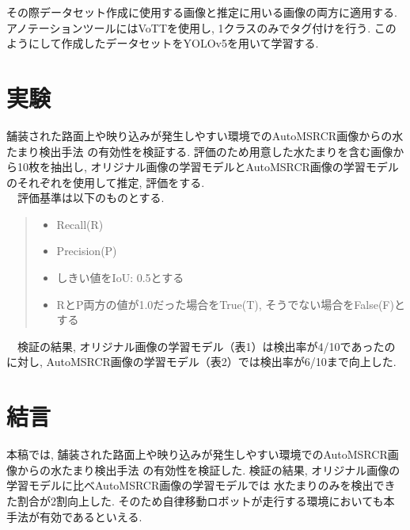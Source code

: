 \documentclass[10pt]{jarticle}
\begin{document}
    その際データセット作成に使用する画像と推定に用いる画像の両方に適用する. 
    アノテーションツールにはVoTTを使用し, 1クラスのみでタグ付けを行う. 
    このようにして作成したデータセットをYOLOv5を用いて学習する. 


    \section{実験}%
    舗装された路面上や映り込みが発生しやすい環境でのAutoMSRCR画像からの水たまり検出手法
    の有効性を検証する. 
    評価のため用意した水たまりを含む画像から10枚を抽出し, 
    オリジナル画像の学習モデルとAutoMSRCR画像の学習モデルのそれぞれを使用して推定, 評価をする. \\
    　評価基準は以下のものとする. 
    \begin{quote}
        \begin{itemize}
         \item Recall(R) 
         \item Precision(P) 
         \item しきい値をIoU: 0.5とする
         \item RとP両方の値が1.0だった場合をTrue(T), 
         そうでない場合をFalse(F)とする
         
        \end{itemize}
       \end{quote}
    　検証の結果, オリジナル画像の学習モデル（表1）は検出率が4/10であったのに対し, 
    AutoMSRCR画像の学習モデル（表2）では検出率が6/10まで向上した. 

    \section{結言}%
    本稿では, 舗装された路面上や映り込みが発生しやすい環境でのAutoMSRCR画像からの水たまり検出手法
    の有効性を検証した. 検証の結果, オリジナル画像の学習モデルに比べAutoMSRCR画像の学習モデルでは
    水たまりのみを検出できた割合が2割向上した. 
    そのため自律移動ロボットが走行する環境においても本手法が有効であるといえる.
     


    



    
    
\end{document}
